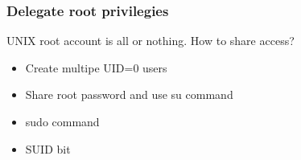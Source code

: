\begin{frame}[fragile]
	\frametitle{Delegate root privilegies}
UNIX root account is all or nothing. How to share access?
  \begin{itemize}
    \item Create multipe UID=0 users
    \item Share root password and use su command
    \item sudo command
    \item SUID bit
  \end{itemize} 

\end{frame}
